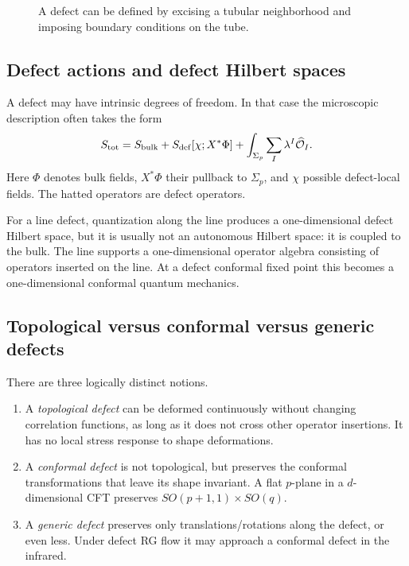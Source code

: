 \documentclass[11pt]{article}
\begin{document}
\begin{figure}[htbp]
\centering
{}
\caption{A defect can be defined by excising a tubular neighborhood and imposing boundary conditions on the tube.}
\end{figure}

\subsection{Defect actions and defect Hilbert spaces}

A defect may have intrinsic degrees of freedom.  In that case the microscopic description often takes the form
\begin{equation}
  S_{\rm tot}=S_{\rm bulk}+S_{\rm def}[\chi;X^*\Phi]+\int_{\Sigma_p}\sum_I \lambda^I \widehat{\mathcal O}_I .
\end{equation}
Here $\Phi$ denotes bulk fields, $X^*\Phi$ their pullback to $\Sigma_p$, and $\chi$ possible defect-local fields.  The hatted operators are defect operators.

For a line defect, quantization along the line produces a one-dimensional defect Hilbert space, but it is usually not an autonomous Hilbert space: it is coupled to the bulk.  The line supports a one-dimensional operator algebra consisting of operators inserted on the line.  At a defect conformal fixed point this becomes a one-dimensional conformal quantum mechanics.

\subsection{Topological versus conformal versus generic defects}

There are three logically distinct notions.
\begin{enumerate}
  \item A \emph{topological defect} can be deformed continuously without changing correlation functions, as long as it does not cross other operator insertions.  It has no local stress response to shape deformations.
  \item A \emph{conformal defect} is not topological, but preserves the conformal transformations that leave its shape invariant.  A flat $p$-plane in a $d$-dimensional CFT preserves $SO(p+1,1)\times SO(q)$.
  \item A \emph{generic defect} preserves only translations/rotations along the defect, or even less.  Under defect RG flow it may approach a conformal defect in the infrared.
\end{enumerate}
\end{document}

